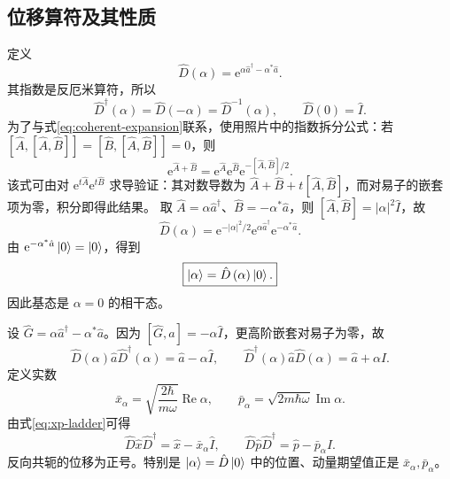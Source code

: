 \subsection{位移算符及其性质}
定义
\begin{equation}
\hat D\left(\alpha\right)=\mathrm{e}^{\alpha\hat a^\dagger-\alpha^*\hat a}.
\end{equation}
其指数是反厄米算符，所以
\begin{equation}
\hat D^\dagger\left(\alpha\right)=\hat D\left(-\alpha\right)=\hat D^{-1}\left(\alpha\right),\qquad
\hat D\left(0\right)=\hat I.
\end{equation}
为了与式\eqref{eq:coherent-expansion}联系，使用照片中的指数拆分公式：若
$\left[\hat A,\left[\hat A,\hat B\right]\right]=\left[\hat B,\left[\hat A,\hat B\right]\right]=0$，则
\begin{equation}
\mathrm{e}^{\hat A+\hat B}
=\mathrm{e}^{\hat A}\mathrm{e}^{\hat B}\mathrm{e}^{-\left[\hat A,\hat B\right]/2}.
\end{equation}
该式可由对 $\mathrm{e}^{t\hat A}\mathrm{e}^{t\hat B}$ 求导验证：其对数导数为
$\hat A+\hat B+t\left[\hat A,\hat B\right]$，而对易子的嵌套项为零，积分即得此结果。
取 $\hat A=\alpha\hat a^\dagger$、$\hat B=-\alpha^*\hat a$，则
$\left[\hat A,\hat B\right]=\left|\alpha\right|^2\hat I$，故
\begin{equation}
\hat D\left(\alpha\right)=\mathrm{e}^{-\left|\alpha\right|^2/2}
\mathrm{e}^{\alpha\hat a^\dagger}\mathrm{e}^{-\alpha^*\hat a}.
\end{equation}
由 $\mathrm{e}^{-\alpha^*\hat a}\Ket{0}=\Ket{0}$，得到
\begin{equation}
\boxed{\Ket{\alpha}=\hat D\left(\alpha\right)\Ket{0}.}
\end{equation}
因此基态是 $\alpha=0$ 的相干态。

设 $\hat G=\alpha\hat a^\dagger-\alpha^*\hat a$。因为
$\left[\hat G,\hat a\right]=-\alpha\hat I$，更高阶嵌套对易子为零，故
\begin{equation}
\hat D\left(\alpha\right)\hat a\hat D^\dagger\left(\alpha\right)=\hat a-\alpha\hat I,\qquad
\hat D^\dagger\left(\alpha\right)\hat a\hat D\left(\alpha\right)=\hat a+\alpha\hat I.
\end{equation}
定义实数
\begin{equation}
\bar x_\alpha=\sqrt{\frac{2\hbar}{m\omega}}\operatorname{Re}\alpha,
\qquad
\bar p_\alpha=\sqrt{2m\hbar\omega}\operatorname{Im}\alpha.
\label{eq:coherent-centers}
\end{equation}
由式\eqref{eq:xp-ladder}可得
\begin{equation}
\hat D\hat x\hat D^\dagger=\hat x-\bar x_\alpha\hat I,\qquad
\hat D\hat p\hat D^\dagger=\hat p-\bar p_\alpha\hat I.
\end{equation}
反向共轭的位移为正号。特别是 $\Ket{\alpha}=\hat D\Ket{0}$ 中的位置、动量期望值正是 $\bar x_\alpha,\bar p_\alpha$。

